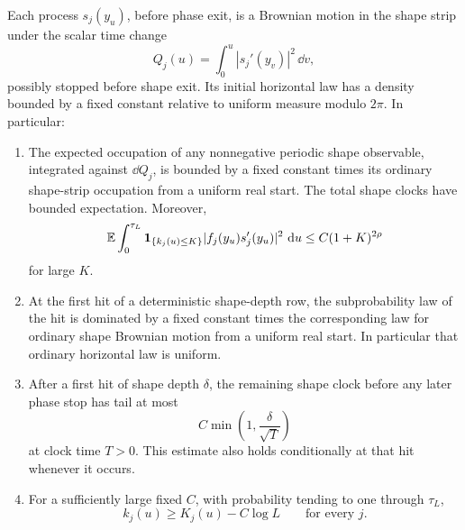 \begin{lemma}
\label{odd:time-change}
Each process \(s_j(y_u)\), before phase exit, is a Brownian motion in the
shape strip under the scalar time change
\[
 Q_j(u)=\int_0^u|s_j'(y_v)|^2\,\dd v,
\]
possibly stopped before shape exit.  Its initial horizontal law has a
density bounded by a fixed constant relative to uniform measure modulo
\(2\pi\).  In particular:
\begin{enumerate}[label=\textup{(\roman*)}]
 \item The expected occupation of any nonnegative periodic shape
 observable, integrated against \(\dd Q_j\), is bounded by a fixed
 constant times its ordinary shape-strip occupation from a uniform real
 start.  The total shape clocks have bounded expectation.  Moreover,
 \begin{equation}
  \mathbb E\int_0^{\tau_L}
       \mathbf 1_{\{k_j(u)\le K\}}|f_j(y_u)s_j'(y_u)|^2\,\,\mathrm d u
       \le C(1+K)^{2\rho}
  \label{odd:angle-clock}
 \end{equation}
 for large \(K\).
 \item At the first hit of a deterministic shape-depth row, the
 subprobability law of the hit is dominated by a fixed constant times the
 corresponding law for ordinary shape Brownian motion from a uniform real
 start.  In particular that ordinary horizontal law is uniform.
 \item After a first hit of shape depth \(\delta\), the remaining shape
 clock before any later phase stop has tail at most
 \begin{equation}
  C\min\left(1,\frac{\delta}{\sqrt T}\right)
  \label{odd:remaining-shape-clock}
 \end{equation}
 at clock time \(T>0\).  This estimate also holds conditionally at that
 hit whenever it occurs.
 \item For a sufficiently large fixed \(C\), with probability tending
 to one through \(\tau_L\),
 \begin{equation}
  k_j(u)\ge K_j(u)-C\log L\qquad\text{for every }j.
  \label{odd:retreat}
 \end{equation}
\end{enumerate}
\end{lemma}

